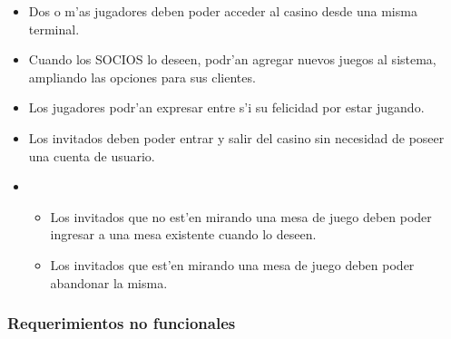 \begin{itemize}
\item {} 

    Dos o m'as jugadores deben poder acceder al casino desde una misma terminal.

\item {} 

    Cuando los SOCIOS lo deseen, podr'an agregar nuevos juegos al sistema, ampliando las opciones para sus clientes.

\end{itemize}



\begin{itemize}

\item {} 

    Los jugadores podr'an expresar entre s'i su felicidad por estar jugando.

\item {} 

    Los invitados deben poder entrar y salir del casino sin necesidad de poseer una cuenta de usuario.

\item {}

    \begin{itemize}
        \item Los invitados que no est'en mirando una mesa de juego deben poder ingresar a una mesa existente cuando lo deseen.
        \item Los invitados que est'en mirando una mesa de juego deben poder abandonar la misma.
    \end{itemize}

\end{itemize}


\subsubsection{Requerimientos no funcionales}

